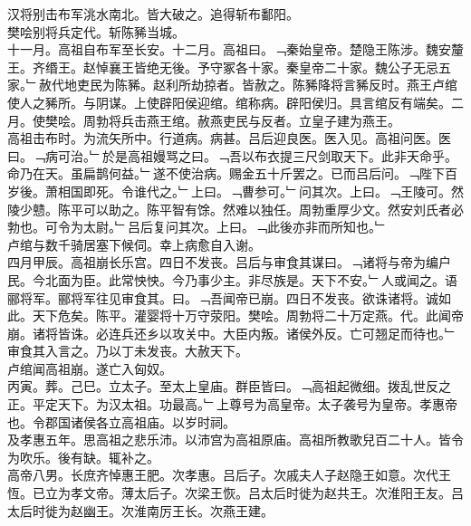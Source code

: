 \documentclass{zhvt-classic}
\begin{document}
\hspace*{2em}汉将别击布军洮水南北。皆大破之。追得斩布鄱阳。\\
\hspace*{2em}樊哙别将兵定代。斩陈豨当城。\\
\hspace*{2em}十一月。高祖自布军至长安。十二月。高祖曰。﹁秦始皇帝。楚隐王陈涉。魏安釐王。齐缗王。赵悼襄王皆绝无後。予守冢各十家。秦皇帝二十家。魏公子无忌五家。﹂赦代地吏民为陈豨。赵利所劫掠者。皆赦之。陈豨降将言豨反时。燕王卢绾使人之豨所。与阴谋。上使辟阳侯迎绾。绾称病。辟阳侯归。具言绾反有端矣。二月。使樊哙。周勃将兵击燕王绾。赦燕吏民与反者。立皇子建为燕王。\\
\hspace*{2em}高祖击布时。为流矢所中。行道病。病甚。吕后迎良医。医入见。高祖问医。医曰。﹁病可治。﹂於是高祖嫚骂之曰。﹁吾以布衣提三尺剑取天下。此非天命乎。命乃在天。虽扁鹊何益。﹂遂不使治病。赐金五十斤罢之。已而吕后问。﹁陛下百岁後。萧相国即死。令谁代之。﹂上曰。﹁曹参可。﹂问其次。上曰。﹁王陵可。然陵少戆。陈平可以助之。陈平智有馀。然难以独任。周勃重厚少文。然安刘氏者必勃也。可令为太尉。﹂吕后复问其次。上曰。﹁此後亦非而所知也。﹂\\
\hspace*{2em}卢绾与数千骑居塞下候伺。幸上病愈自入谢。\\
\hspace*{2em}四月甲辰。高祖崩长乐宫。四日不发丧。吕后与审食其谋曰。﹁诸将与帝为编户民。今北面为臣。此常怏怏。今乃事少主。非尽族是。天下不安。﹂人或闻之。语郦将军。郦将军往见审食其。曰。﹁吾闻帝已崩。四日不发丧。欲诛诸将。诚如此。天下危矣。陈平。灌婴将十万守荥阳。樊哙。周勃将二十万定燕。代。此闻帝崩。诸将皆诛。必连兵还乡以攻关中。大臣内叛。诸侯外反。亡可翘足而待也。﹂审食其入言之。乃以丁未发丧。大赦天下。\\
\hspace*{2em}卢绾闻高祖崩。遂亡入匈奴。\\
\hspace*{2em}丙寅。葬。己巳。立太子。至太上皇庙。群臣皆曰。﹁高祖起微细。拨乱世反之正。平定天下。为汉太祖。功最高。﹂上尊号为高皇帝。太子袭号为皇帝。孝惠帝也。令郡国诸侯各立高祖庙。以岁时祠。\\
\hspace*{2em}及孝惠五年。思高祖之悲乐沛。以沛宫为高祖原庙。高祖所教歌兒百二十人。皆令为吹乐。後有缺。辄补之。\\
\hspace*{2em}高帝八男。长庶齐悼惠王肥。次孝惠。吕后子。次戚夫人子赵隐王如意。次代王恆。已立为孝文帝。薄太后子。次梁王恢。吕太后时徙为赵共王。次淮阳王友。吕太后时徙为赵幽王。次淮南厉王长。次燕王建。\\
\end{document}
